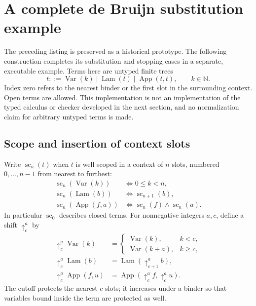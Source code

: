 \def\topic{Capture-avoiding de Bruijn substitution}

\section{A complete de Bruijn substitution example}
\label{sec:debruijn_substitution}
The preceding listing is preserved as a historical prototype. The
following construction completes its substitution and stopping cases
in a separate, executable example. Terms here are untyped finite trees
\[
t::=\operatorname{Var}(k)\mid\operatorname{Lam}(t)
       \mid\operatorname{App}(t,t),\qquad k\in\mathbb N.
\]
Index zero refers to the nearest binder or the first slot in the
surrounding context. Open terms are allowed. This implementation is
not an implementation of the typed calculus or checker developed in
the next section, and no normalization claim for arbitrary untyped
terms is made.

\subsection{Scope and insertion of context slots}
Write $\operatorname{sc}_n(t)$ when $t$ is well scoped in a context
of $n$ slots, numbered $0,\ldots,n-1$ from nearest to furthest:
\[
\begin{aligned}
\operatorname{sc}_n(\operatorname{Var}(k))&\iff 0\leq k<n,\\
\operatorname{sc}_n(\operatorname{Lam}(b))&\iff\operatorname{sc}_{n+1}(b),\\
\operatorname{sc}_n(\operatorname{App}(f,a))
 &\iff\operatorname{sc}_n(f)\land\operatorname{sc}_n(a).
\end{aligned}
\]
In particular $\operatorname{sc}_0$ describes closed terms.
For nonnegative integers $a,c$, define a shift $\uparrow^a_c$ by
\[
\begin{aligned}
\uparrow^a_c\operatorname{Var}(k)
 &=\begin{cases}\operatorname{Var}(k),&k<c,\\
                  \operatorname{Var}(k+a),&k\geq c,\end{cases}\\
\uparrow^a_c\operatorname{Lam}(b)
 &=\operatorname{Lam}(\uparrow^a_{c+1}b),\\
\uparrow^a_c\operatorname{App}(f,u)
 &=\operatorname{App}(\uparrow^a_c f,\uparrow^a_c u).
\end{aligned}
\]
The cutoff protects the nearest $c$ slots; it increases under a binder
so that variables bound inside the term are protected as well.

